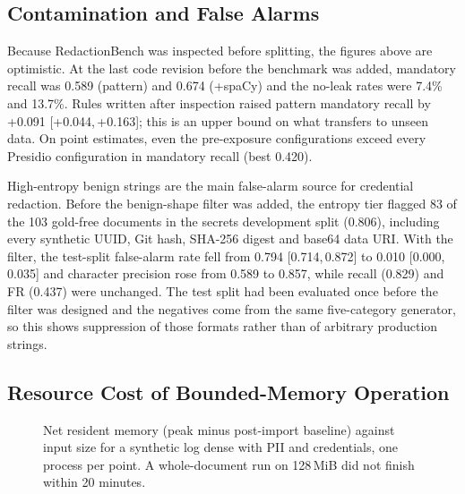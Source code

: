 \documentclass[conference]{IEEEtran}
\begin{document}
\subsection{Contamination and False Alarms}

Because RedactionBench was inspected before splitting, the figures above are
optimistic. At the last code revision before the benchmark was added, mandatory
recall was 0.589 (pattern) and 0.674 (+spaCy) and the no-leak rates were 7.4\%
and 13.7\%. Rules written after inspection raised pattern mandatory recall by
+0.091 [+0.044,\,+0.163]; this is an upper bound on what transfers to unseen
data. On point estimates, even the pre-exposure configurations exceed every
Presidio configuration in mandatory recall (best 0.420).

High-entropy benign strings are the main false-alarm source for credential
redaction. Before the benign-shape filter was added, the entropy tier flagged
83 of the 103 gold-free documents in the secrets development split (0.806),
including every synthetic UUID, Git hash, SHA-256 digest and base64 data URI.
With the filter, the test-split false-alarm rate fell from 0.794
[0.714,\,0.872] to 0.010 [0.000,\,0.035] and character precision rose from
0.589 to 0.857, while recall (0.829) and FR (0.437) were unchanged. The test
split had been evaluated once before the filter was designed and the negatives
come from the same five-category generator, so this shows suppression of those
formats rather than of arbitrary production strings.

\subsection{Resource Cost of Bounded-Memory Operation}

\begin{figure}[t]
\centering
{}
\caption{Net resident memory (peak minus post-import baseline) against input
size for a synthetic log dense with PII and credentials, one process per
point. A whole-document run on 128\,MiB did not finish within 20 minutes.}
\label{fig:memory}
\end{figure}
\end{document}
